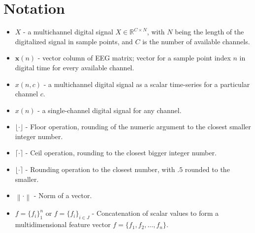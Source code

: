 \chapter*{Notation}

\begin{itemize}
\item $X$ -  a multichannel digital signal $X \in \mathbb{R}^{C \times N}$, with $N$ being the length of the digitalized signal in sample points, and $C$ is the number of available channels.  
\item $\mathbf{x}(n)$ - vector column of EEG matrix; vector for a sample point index $n$ in digital time for every available channel.  
\item $x(n,c)$ - a multichannel digital signal as a scalar time-series for a particular channel $c$.  
\item $x(n)$ - a single-channel digital signal for any channel.
\item $\lfloor \cdot \rfloor$ - Floor operation, rounding of the numeric argument to the closest smaller integer number.
\item $\lceil \cdot \rceil$ - Ceil operation, rounding to the closest bigger integer number.
\item $\lfloor \cdot \rceil$ - Rounding operation to the closest number, with $.5$ rounded to the smaller.
\item $\left\lVert \cdot \right\rVert$ - Norm of a vector.
\item $f=\{f_i\}_{1}^{n} $ or $f=\{f_i\}_{i \in J}^{} $ - Concatenation of scalar values to form a multidimensional feature vector $f=\{f_1,f_2,...,f_n\}$.
\end{itemize}


%
%
